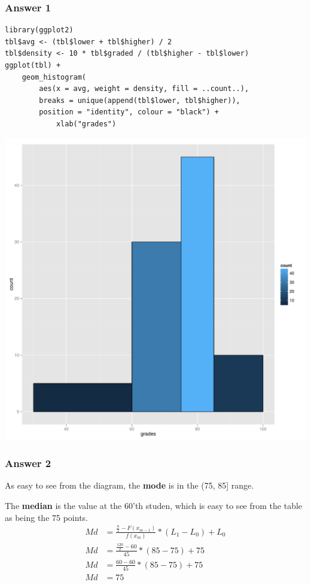 \documentclass[11pt]{article}
\begin{document}
\subsubsection{Answer 1}
\label{sec-1-1-1}

\lstset{language=R,label=students-histogram,numbers=none}
\begin{lstlisting}
library(ggplot2)
tbl$avg <- (tbl$lower + tbl$higher) / 2
tbl$density <- 10 * tbl$graded / (tbl$higher - tbl$lower)
ggplot(tbl) + 
    geom_histogram(
        aes(x = avg, weight = density, fill = ..count..), 
        breaks = unique(append(tbl$lower, tbl$higher)),
        position = "identity", colour = "black") +
            xlab("grades")
\end{lstlisting}

\includegraphics[width=.9\linewidth]{images/students.pdf}
\subsubsection{Answer 2}
\label{sec-1-1-2}
As easy to see from the diagram, the \textbf{mode} is in the (75, 85] range.

The \textbf{median} is the value at the 60'th studen, which is easy to see
from the table as being the 75 points.
\begin{equation*}
  \begin{aligned}
    Md &= \frac{\frac{n}{2} - F(x_{m-1})}{f(x_m)} * (L_1-L_0)+L_0 \\
    Md &= \frac{\frac{120}{2} - 60}{45} * (85 - 75) + 75 \\
    Md &= \frac{60 - 60}{45} * (85 - 75) + 75 \\
    Md &= 75
  \end{aligned}
\end{equation*}
\end{document}
